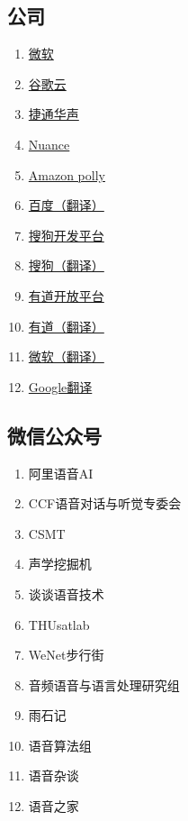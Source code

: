 \documentclass[cn,10pt,math=newtx,citestyle=gb7714-2015,bibstyle=gb7714-2015]{elegantbook}
\begin{document}
\subsection{公司}
\begin{enumerate}
  \item \href{https://azure.microsoft.com/en-us/services/cognitive-services/text-to-speech/#features}{微软}
  \item \href{https://cloud.google.com/text-to-speech/docs/voices?hl=zh-cn}{谷歌云}
  \item \href{https://www.aicloud.com/dev/ability/index.html?key=tts#ability-experience}{捷通华声}
  \item \href{https://www.nuance.com/omni-channel-customer-engagement/voice-and-ivr/text-to-speech.html#!}{Nuance}
  \item \href{https://aws.amazon.com/cn/polly/}{Amazon polly}
  \item \href{https://fanyi.baidu.com/}{百度（翻译）}
  \item \href{https://ai.sogou.com/product/audio_composition/}{搜狗开发平台}
  \item \href{https://fanyi.sogou.com/}{搜狗（翻译）}
  \item \href{https://ai.youdao.com/product-tts.s}{有道开放平台}
  \item \href{http://fanyi.youdao.com}{有道（翻译）}
  \item \href{https://cn.bing.com/translator}{微软（翻译）}
  \item \href{https://translate.google.cn/}{Google翻译}
\end{enumerate}

\subsection{微信公众号}

\begin{enumerate}
  \item 阿里语音AI
  \item CCF语音对话与听觉专委会
  \item CSMT
  \item 声学挖掘机
  \item 谈谈语音技术
  \item THUsatlab
  \item WeNet步行街
  \item 音频语音与语言处理研究组
  \item 雨石记
  \item 语音算法组
  \item 语音杂谈
  \item 语音之家
\end{enumerate}
\end{document}
